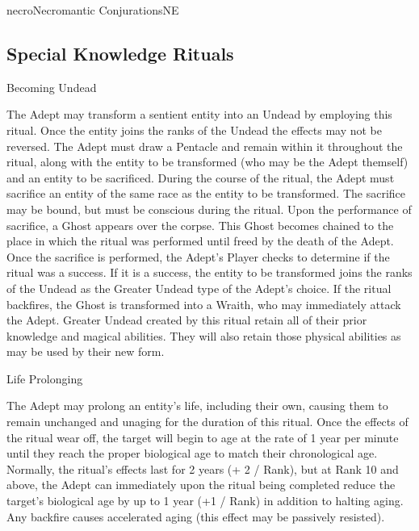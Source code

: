 \begin{college}[1.1]{necro}{Necromantic Conjurations}{NE}
\subsection{Special Knowledge Rituals}

\begin{ritual}[R-1]{Becoming Undead}

\begin{effects}
The Adept may transform a sentient entity into an Undead by employing
this ritual. Once the entity joins the ranks of the Undead the effects
may not be reversed.  The Adept must draw a Pentacle and remain within
it throughout the ritual, along with the entity to be transformed (who
may be the Adept themself) and an entity to be sacrificed.  During the
course of the ritual, the Adept must sacrifice an entity of the same
race as the entity to be transformed.  The sacrifice may be bound, but
must be conscious during the ritual.  Upon the performance of
sacrifice, a Ghost appears over the corpse.  This Ghost becomes
chained to the place in which the ritual was performed until freed by
the death of the Adept.  Once the sacrifice is performed, the Adept's
Player checks to determine if the ritual was a success.  If it is a
success, the entity to be transformed joins the ranks of the Undead as
the Greater Undead type of the Adept's choice.  If the ritual
backfires, the Ghost is transformed into a Wraith, who may immediately
attack the Adept.  Greater Undead created by this ritual retain all of
their prior knowledge and magical abilities.  They will also retain
those physical abilities as may be used by their new form.
\end{effects}
\end{ritual}

\begin{ritual}[R-2]{Life Prolonging}

\begin{effects}
The Adept may prolong an entity's life, including their own, causing
them to remain unchanged and unaging for the duration of this ritual.
Once the effects of the ritual wear off, the target will begin to age
at the rate of 1 year per minute until they reach the proper
biological age to match their chronological age.  Normally, the
ritual's effects last for 2 years (+ 2 / Rank), but at Rank 10 and
above, the Adept can immediately upon the ritual being completed
reduce the target's biological age by up to 1 year (+1 / Rank) in
addition to halting aging.  Any backfire causes accelerated aging
(this effect may be passively resisted).


\end{effects}
\end{ritual}
\end{college}
